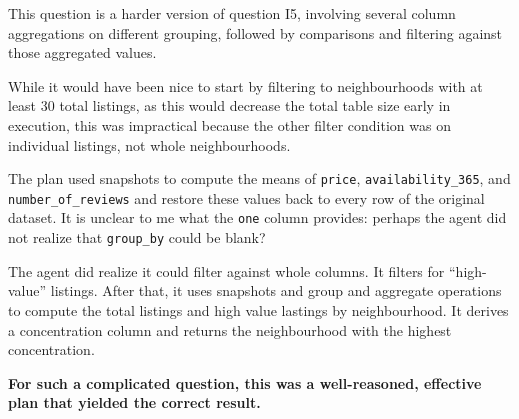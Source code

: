 

This question is a harder version of question I5, involving several column aggregations on different grouping, followed by comparisons and filtering against those aggregated values.

While it would have been nice to start by filtering to neighbourhoods with at least 30 total listings, as this would decrease the total table size early in execution, this was impractical because the other filter condition was on individual listings, not whole neighbourhoods.

The plan used snapshots to compute the means of \texttt{price}, \texttt{availability\_365}, and \texttt{number\_of\_reviews} and restore these values back to every row of the original dataset. It is unclear to me what the \texttt{one} column provides: perhaps the agent did not realize that \texttt{group\_by} could be blank?

The agent did realize it could filter against whole columns. It filters for ``high-value'' listings. After that, it uses snapshots and group and aggregate operations to compute the total listings and high value lastings by neighbourhood. It derives a concentration column and returns the neighbourhood with the highest concentration.

\textbf{For such a complicated question, this was a well-reasoned, effective plan that yielded the correct result.}


